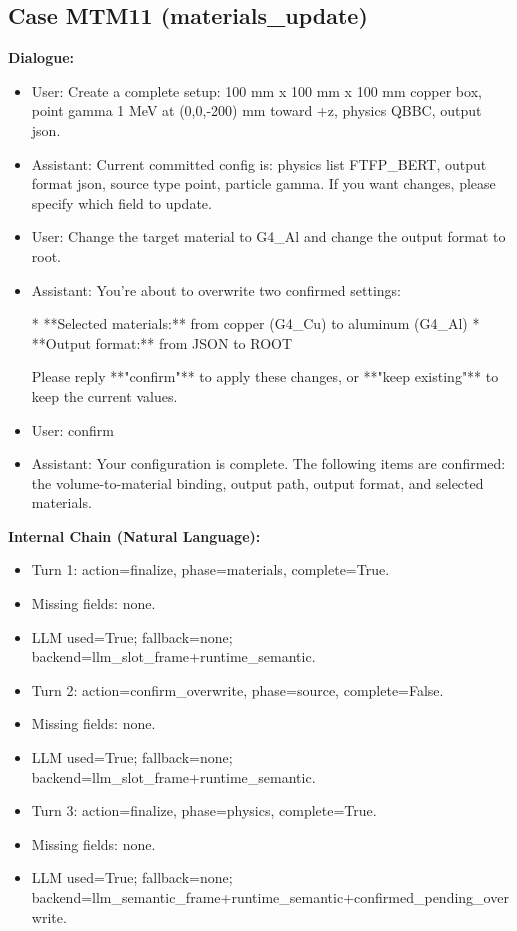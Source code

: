 \documentclass[11pt]{ctexart}
\begin{document}
\subsection{Case MTM11 (materials\_update)}
\textbf{Dialogue:}
\begin{itemize}
\item User: Create a complete setup: 100 mm x 100 mm x 100 mm copper box, point gamma 1 MeV at (0,0,-200) mm toward +z, physics QBBC, output json.
\item Assistant: Current committed config is: physics list FTFP\_BERT, output format json, source type point, particle gamma. If you want changes, please specify which field to update.
\item User: Change the target material to G4\_Al and change the output format to root.
\item Assistant: You're about to overwrite two confirmed settings:

*   **Selected materials:** from copper (G4\_Cu) to aluminum (G4\_Al)
*   **Output format:** from JSON to ROOT

Please reply **"confirm"** to apply these changes, or **"keep existing"** to keep the current values.
\item User: confirm
\item Assistant: Your configuration is complete. The following items are confirmed: the volume-to-material binding, output path, output format, and selected materials.
\end{itemize}
\textbf{Internal Chain (Natural Language):}
\begin{itemize}
\item Turn 1: action=finalize, phase=materials, complete=True.
\item Missing fields: none.
\item LLM used=True; fallback=none; backend=llm\_slot\_frame+runtime\_semantic.
\item Turn 2: action=confirm\_overwrite, phase=source, complete=False.
\item Missing fields: none.
\item LLM used=True; fallback=none; backend=llm\_slot\_frame+runtime\_semantic.
\item Turn 3: action=finalize, phase=physics, complete=True.
\item Missing fields: none.
\item LLM used=True; fallback=none; backend=llm\_semantic\_frame+runtime\_semantic+confirmed\_pending\_overwrite.
\end{itemize}
\end{document}
